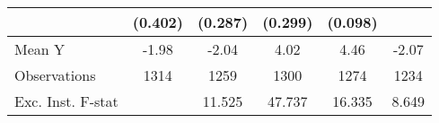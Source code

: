{\begin{tabular}{l*{5}{c}}
            &     (0.402)         &     (0.287)         &     (0.299)         &     (0.098)         &                     \\
\midrule
Mean Y      &       -1.98         &       -2.04         &        4.02         &        4.46         &       -2.07         \\
Observations&        1314         &        1259         &        1300         &        1274         &        1234         \\
Exc. Inst. F-stat&                     &      11.525         &      47.737         &      16.335         &       8.649         \\
\bottomrule
\end{tabular}
}
